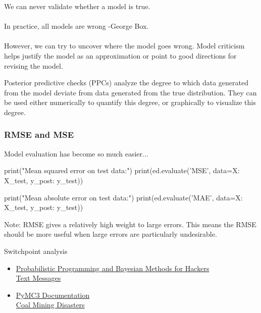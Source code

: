 \documentclass[table,dvipsnames]{beamer}
\newcommand{\keywd}{\textcolor{myorange}}
\begin{document}
\begin{frame}[fragile]
\footnotesize
\begin{block}{}
We can never validate whether a model is true.
\\ \ \\
\keywd{In practice, all models are wrong -George Box}.
\\ \ \\
However, we can try to uncover where the model goes wrong. Model criticism helps justify the
model as an approximation or point to good directions for revising the model.
\end{block}
\vspace{1cm}
Posterior predictive checks (PPCs) analyze the degree to which data generated from the model deviate
from data generated from the true distribution. They can be used either numerically to quantify this
degree, or graphically to visualize this degree.
\end{frame}

\begin{frame}[fragile]
\footnotesize
\frametitle{RMSE and MSE}
Model evaluation has become so much easier...
\vspace{1cm}
\begin{code}
print("Mean squared error on test data:")
print(ed.evaluate('MSE', data={X: X_test, y_post: y_test}))
\end{code}

\begin{code}
print("Mean absolute error on test data:")
print(ed.evaluate('MAE', data={X: X_test, y_post: y_test}))
\end{code}
\vspace{1cm}
Note: RMSE gives a relatively high weight to large errors. This means the RMSE should be more useful when large errors are particularly undesirable.
\end{frame}

\begin{frame}[fragile]
\begin{block}{Switchpoint analysis}
\footnotesize
\begin{itemize}
 \item \href{http://nbviewer.jupyter.org/github/CamDavidsonPilon/Probabilistic-Programming-and-Bayesian-Methods-for-Hackers/blob/master/Chapter1\_Introduction/Ch1\_Introduction\_PyMC3.ipynb}{Probabilistic Programming and Bayesian Methods for Hackers \\ Text Messages}
 \item \href{http://docs.pymc.io/notebooks/getting_started.html}{PyMC3 Documentation \\ Coal Mining Disasters}
\end{itemize}
\end{block}
\end{frame}
\end{document}
